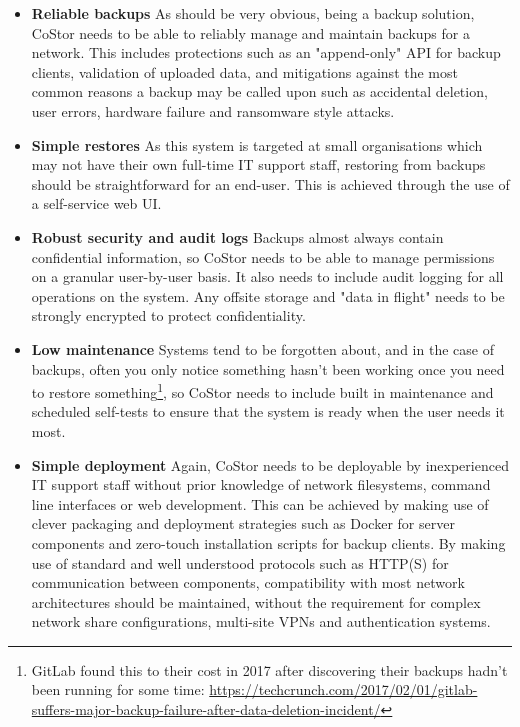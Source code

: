 \documentclass[bsc,frontabs,twoside,singlespacing,parskip,deptreport]{infthesis}     %
\begin{document}
\begin{itemize}
	\item \textbf{Reliable backups}
		\subitem As should be very obvious, being a backup solution, CoStor needs to be
		able to reliably manage and maintain backups for a network. This includes
		protections such as an "append-only" API for backup clients, validation of 
		uploaded data, and mitigations against the most common reasons a backup
		may be called upon such as accidental deletion, user errors, hardware failure and 
		ransomware style attacks.
	\item \textbf{Simple restores}
		\subitem As this system is targeted at small organisations which may not have their
		own full-time IT support staff, restoring from backups should be straightforward 
		for an end-user. This is achieved through the use of a self-service web UI.
	\item \textbf{Robust security and audit logs}
		\subitem Backups almost always contain confidential information, so CoStor needs 
		to be able to manage permissions on a granular user-by-user basis. It also needs 
		to include audit logging for all operations on the system. Any offsite storage and
		"data in flight" needs to be strongly encrypted to protect confidentiality.
	\item \textbf{Low maintenance}
		\subitem Systems tend to be forgotten about, and in the case of backups, often you
		only notice something hasn't been working once you need to restore 
		something\footnote{GitLab found this to their cost in 2017 after discovering their 
		backups hadn't been running for some time: 
		\url{https://techcrunch.com/2017/02/01/gitlab-suffers-major-backup-failure-after-data-deletion-incident/}},
		so CoStor needs to include built in maintenance and scheduled self-tests to ensure
		that the system is ready when the user needs it most.
	\item \textbf{Simple deployment}
		\subitem Again, CoStor needs to be deployable by inexperienced IT support staff
		without prior knowledge of network filesystems, command line interfaces or web
		development. This can be achieved by making use of clever packaging and deployment 
		strategies such as Docker for server components and zero-touch installation scripts
		for backup clients. By making use of standard and well understood protocols such
		as HTTP(S) for communication between components, compatibility with most network
		architectures should be maintained, without the requirement for complex network 
		share configurations, multi-site VPNs and authentication systems.

\end{itemize}
\end{document}
